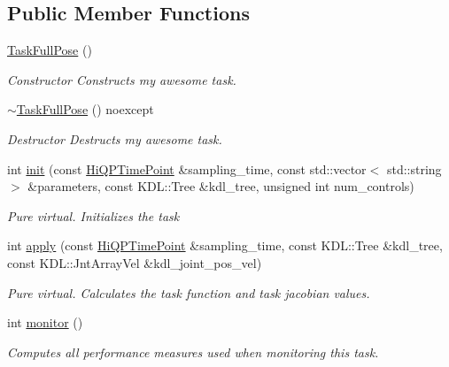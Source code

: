 \subsection*{Public Member Functions}
\begin{DoxyCompactItemize}
\item 
\hypertarget{classhiqp_1_1TaskFullPose_a9791ec10bf86952b38726b4576dba015}{\hyperlink{classhiqp_1_1TaskFullPose_a9791ec10bf86952b38726b4576dba015}{Task\-Full\-Pose} ()}\label{classhiqp_1_1TaskFullPose_a9791ec10bf86952b38726b4576dba015}

\begin{DoxyCompactList}\small\item\em Constructor Constructs my awesome task. \end{DoxyCompactList}\item 
\hypertarget{classhiqp_1_1TaskFullPose_a88c4631a941fa37850919c8e87cf09a8}{\hyperlink{classhiqp_1_1TaskFullPose_a88c4631a941fa37850919c8e87cf09a8}{$\sim$\-Task\-Full\-Pose} () noexcept}\label{classhiqp_1_1TaskFullPose_a88c4631a941fa37850919c8e87cf09a8}

\begin{DoxyCompactList}\small\item\em Destructor Destructs my awesome task. \end{DoxyCompactList}\item 
int \hyperlink{classhiqp_1_1TaskFullPose_aed1a9b16310f7a7c991732701bd03ce0}{init} (const \hyperlink{classhiqp_1_1HiQPTimePoint}{Hi\-Q\-P\-Time\-Point} \&sampling\-\_\-time, const std\-::vector$<$ std\-::string $>$ \&parameters, const K\-D\-L\-::\-Tree \&kdl\-\_\-tree, unsigned int num\-\_\-controls)
\begin{DoxyCompactList}\small\item\em {\itshape Pure virtual}. Initializes the task \end{DoxyCompactList}\item 
int \hyperlink{classhiqp_1_1TaskFullPose_a7dcaa206ba1a24d205504ffaa3f55ac6}{apply} (const \hyperlink{classhiqp_1_1HiQPTimePoint}{Hi\-Q\-P\-Time\-Point} \&sampling\-\_\-time, const K\-D\-L\-::\-Tree \&kdl\-\_\-tree, const K\-D\-L\-::\-Jnt\-Array\-Vel \&kdl\-\_\-joint\-\_\-pos\-\_\-vel)
\begin{DoxyCompactList}\small\item\em {\itshape Pure virtual}. Calculates the task function and task jacobian values. \end{DoxyCompactList}\item 
int \hyperlink{classhiqp_1_1TaskFullPose_a46c3585f15b89f793b6a9debcb6e5db9}{monitor} ()
\begin{DoxyCompactList}\small\item\em Computes all performance measures used when monitoring this task. \end{DoxyCompactList}\end{DoxyCompactItemize}
